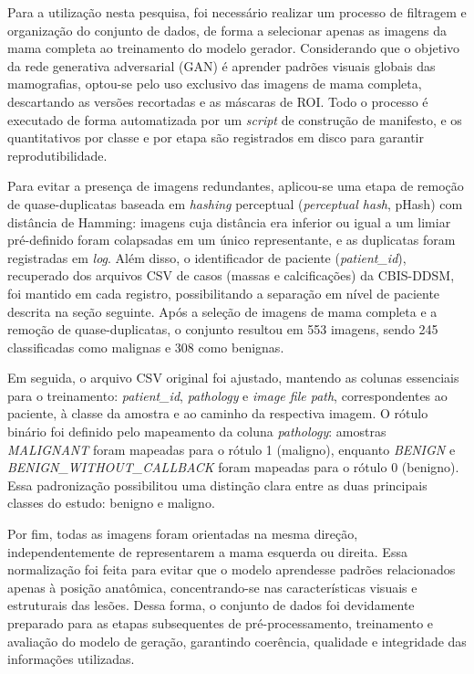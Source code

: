\documentclass[
	12pt,				%
	openright,			%
	oneside,			%
	a4paper,			%
	tcc,			%
	]{ABNT-DC-UEL}
\begin{document}
Para a utilização nesta pesquisa, foi necessário realizar um processo de filtragem e organização do conjunto de dados, de forma a selecionar apenas as imagens da mama completa ao treinamento do modelo gerador. Considerando que o objetivo da rede generativa adversarial (GAN) é aprender padrões visuais globais das mamografias, optou-se pelo uso exclusivo das imagens de mama completa, descartando as versões recortadas e as máscaras de ROI. Todo o processo é executado de forma automatizada por um \textit{script} de construção de manifesto, e os quantitativos por classe e por etapa são registrados em disco para garantir reprodutibilidade.

Para evitar a presença de imagens redundantes, aplicou-se uma etapa de remoção de quase-duplicatas baseada em \textit{hashing} perceptual (\textit{perceptual hash}, pHash) com distância de Hamming: imagens cuja distância era inferior ou igual a um limiar pré-definido foram colapsadas em um único representante, e as duplicatas foram registradas em \textit{log}. Além disso, o identificador de paciente (\textit{patient\_id}), recuperado dos arquivos CSV de casos (massas e calcificações) da CBIS-DDSM, foi mantido em cada registro, possibilitando a separação em nível de paciente descrita na seção seguinte. Após a seleção de imagens de mama completa e a remoção de quase-duplicatas, o conjunto resultou em 553 imagens, sendo 245 classificadas como malignas e 308 como benignas.

Em seguida, o arquivo CSV original foi ajustado, mantendo as colunas essenciais para o treinamento: \textit{patient\_id}, \textit{pathology} e \textit{image file path}, correspondentes ao paciente, à classe da amostra e ao caminho da respectiva imagem. O rótulo binário foi definido pelo mapeamento da coluna \textit{pathology}: amostras \textit{MALIGNANT} foram mapeadas para o rótulo 1 (maligno), enquanto \textit{BENIGN} e \textit{BENIGN\_WITHOUT\_CALLBACK} foram mapeadas para o rótulo 0 (benigno). Essa padronização possibilitou uma distinção clara entre as duas principais classes do estudo: benigno e maligno.

Por fim, todas as imagens foram orientadas na mesma direção, independentemente de representarem a mama esquerda ou direita. Essa normalização foi feita para evitar que o modelo aprendesse padrões relacionados apenas à posição anatômica, concentrando-se nas características visuais e estruturais das lesões. Dessa forma, o conjunto de dados foi devidamente preparado para as etapas subsequentes de pré-processamento, treinamento e avaliação do modelo de geração, garantindo coerência, qualidade e integridade das informações utilizadas.
\end{document}
